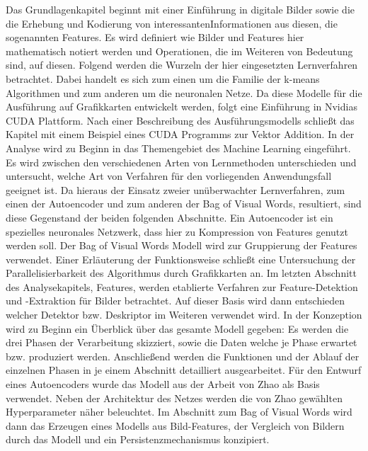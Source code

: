 Das Grundlagenkapitel beginnt mit einer Einführung in digitale Bilder sowie die die Erhebung und Kodierung von \glqq interessanten\grqq Informationen aus diesen, die sogenannten Features. Es wird definiert wie Bilder und Features hier mathematisch notiert werden und Operationen, die im Weiteren von Bedeutung sind, auf diesen. Folgend werden die Wurzeln der hier eingesetzten Lernverfahren betrachtet. Dabei handelt es sich zum einen um die Familie der k-means Algorithmen und zum anderen um die neuronalen Netze. Da diese Modelle für die Ausführung auf Grafikkarten entwickelt werden, folgt eine Einführung in Nvidias CUDA Plattform. Nach einer Beschreibung des Ausführungsmodells schließt das Kapitel mit einem Beispiel eines CUDA Programms zur Vektor Addition. \newline
In der Analyse wird zu Beginn in das Themengebiet des Machine Learning eingeführt. Es wird zwischen den verschiedenen Arten von Lernmethoden unterschieden und untersucht, welche Art von Verfahren für den vorliegenden Anwendungsfall geeignet ist. Da hieraus der Einsatz zweier unüberwachter Lernverfahren, zum einen der Autoencoder und zum anderen der Bag of Visual Words, resultiert, sind diese Gegenstand der beiden folgenden Abschnitte. Ein Autoencoder ist ein spezielles neuronales Netzwerk, dass hier zu Kompression von Features genutzt werden soll. Der Bag of Visual Words Modell wird zur Gruppierung der Features verwendet. Einer Erläuterung der Funktionsweise schließt eine Untersuchung der Parallelisierbarkeit des Algorithmus durch Grafikkarten an. Im letzten Abschnitt des Analysekapitels, Features, werden etablierte Verfahren zur Feature-Detektion und -Extraktion für Bilder betrachtet. Auf dieser Basis wird dann entschieden welcher Detektor bzw. Deskriptor im Weiteren verwendet wird. \newline
In der Konzeption wird zu Beginn ein Überblick über das gesamte Modell gegeben: Es werden die drei Phasen der Verarbeitung skizziert, sowie die Daten welche je Phase erwartet bzw. produziert werden. Anschließend werden die Funktionen und der Ablauf der einzelnen Phasen in je einem Abschnitt detailliert ausgearbeitet. Für den Entwurf eines Autoencoders wurde das Modell aus der Arbeit von Zhao \cite{aed2016} als Basis verwendet. Neben der Architektur des Netzes werden die von Zhao gewählten Hyperparameter näher beleuchtet. Im Abschnitt zum Bag of Visual Words wird dann das Erzeugen eines Modells aus Bild-Features, der Vergleich von Bildern durch das Modell und ein Persistenzmechanismus konzipiert. \newline
